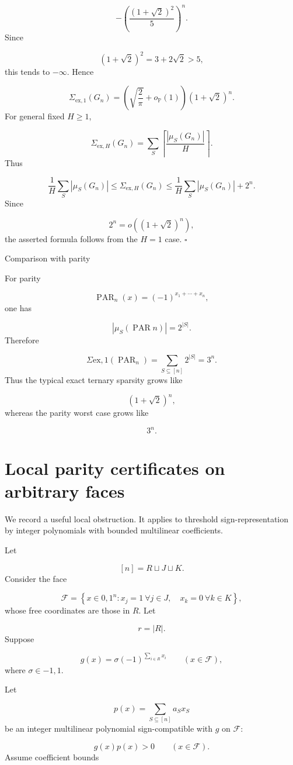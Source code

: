 \documentclass[11pt]{article}
\theoremstyle{definition}
\begin{document}
\[
-\left(\frac{(1+\sqrt2)^2}{5}\right)^n.
\]
Since

\[
(1+\sqrt2)^2=3+2\sqrt2>5,
\]
this tends to $-\infty$. Hence

\[
\Sigma_{\mathrm{ex},1}(G_n)
=
\left(
\sqrt{\frac2\pi}
+
o_{\mathbb{P}}(1)
\right)
(1+\sqrt2)^n.
\]
For general fixed $H\ge1$,

\[
\Sigma_{\mathrm{ex},H}(G_n)
=
\sum_S
\left\lceil
\frac{|\mu_S(G_n)|}{H}
\right\rceil.
\]
Thus

\[
\frac1H\sum_S|\mu_S(G_n)|
\le
\Sigma_{\mathrm{ex},H}(G_n)
\le
\frac1H\sum_S|\mu_S(G_n)|+2^n.
\]
Since

\[
2^n=o((1+\sqrt2)^n),
\]
the asserted formula follows from the $H=1$ case. $\square$

Comparison with parity

For parity

\[
\operatorname{PAR}_n(x)=(-1)^{x_1+\cdots+x_n},
\]
one has

\[
|\mu_S(\operatorname{PAR}n)|=2^{|S|}.
\]
Therefore

\[
\Sigma{\mathrm{ex},1}(\operatorname{PAR}_n)
=
\sum_{S\subseteq[n]}2^{|S|}
=
3^n.
\]
Thus the typical exact ternary sparsity grows like

\[
(1+\sqrt2)^n,
\]
whereas the parity worst case grows like

\[
3^n.
\]
\section{Local parity certificates on arbitrary faces}
We record a useful local obstruction. It applies to threshold sign-representation by integer polynomials with bounded multilinear coefficients.

Let

\[
[n]=R\sqcup J\sqcup K.
\]
Consider the face

\[
\mathcal F=
\left\{
x\in{0,1}^n:
x_j=1\ \forall j\in J,\quad
x_k=0\ \forall k\in K
\right\},
\]
whose free coordinates are those in $R$. Let

\[
r=|R|.
\]
Suppose

\[
g(x)=\sigma(-1)^{\sum_{i\in R}x_i}
\qquad
(x\in\mathcal F),
\]
where $\sigma\in{-1,1}$.

Let

\[
p(x)=\sum_{S\subseteq[n]}a_Sx_S
\]
be an integer multilinear polynomial sign-compatible with $g$ on $\mathcal F$:

\[
g(x)p(x)>0
\qquad
(x\in\mathcal F).
\]
Assume coefficient bounds
\end{document}
